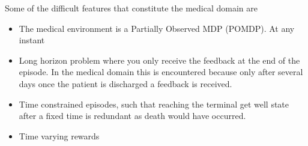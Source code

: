 Some of the difficult features that constitute the medical domain are 

\begin{itemize}
\item The medical environment is a Partially Observed MDP (POMDP). At any instant
\item Long horizon problem where you only receive the feedback at the end of the episode. In the medical domain this is encountered because only after several days once the patient is discharged a feedback is received.
\item Time constrained episodes, such that reaching the terminal get well state after a fixed time is redundant as death would have occurred.
\item Time varying rewards
\end{itemize}